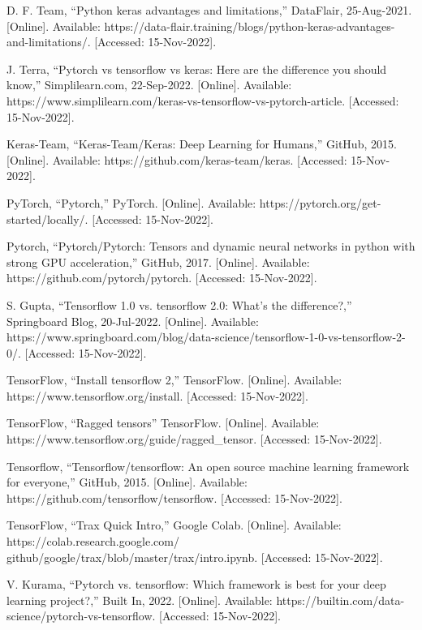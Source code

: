 \documentclass[conference]{IEEEtran}
\begin{document}
\begin{thebibliography}{00}

 D. F. Team, “Python keras advantages and limitations,” DataFlair, 25-Aug-2021. [Online]. Available: https://data-flair.training/blogs/python-keras-advantages-and-limitations/. [Accessed: 15-Nov-2022]. 

 J. Terra, “Pytorch vs tensorflow vs keras: Here are the difference you should know,” Simplilearn.com, 22-Sep-2022. [Online]. Available: https://www.simplilearn.com/keras-vs-tensorflow-vs-pytorch-article. [Accessed: 15-Nov-2022]. 

 Keras-Team, “Keras-Team/Keras: Deep Learning for Humans,” GitHub, 2015. [Online]. Available: https://github.com/keras-team/keras. [Accessed: 15-Nov-2022]. 

 PyTorch, “Pytorch,” PyTorch. [Online]. Available: https://pytorch.org/get-started/locally/. [Accessed: 15-Nov-2022]. 

 Pytorch, “Pytorch/Pytorch: Tensors and dynamic neural networks in python with strong GPU acceleration,” GitHub, 2017. [Online]. Available: https://github.com/pytorch/pytorch. [Accessed: 15-Nov-2022]. 

 S. Gupta, “Tensorflow 1.0 vs. tensorflow 2.0: What's the difference?,” Springboard Blog, 20-Jul-2022. [Online]. Available: https://www.springboard.com/blog/data-science/tensorflow-1-0-vs-tensorflow-2-0/. [Accessed: 15-Nov-2022]. 

 TensorFlow, “Install tensorflow 2,” TensorFlow. [Online]. Available: https://www.tensorflow.org/install. [Accessed: 15-Nov-2022]. 

 TensorFlow, “Ragged tensors” TensorFlow. [Online]. Available: https://www.tensorflow.org/guide/ragged\_tensor. [Accessed: 15-Nov-2022]. 

 Tensorflow, “Tensorflow/tensorflow: An open source machine learning framework for everyone,” GitHub, 2015. [Online]. Available: https://github.com/tensorflow/tensorflow. [Accessed: 15-Nov-2022]. 

 TensorFlow, “Trax Quick Intro,” Google Colab. [Online]. Available: https://colab.research.google.com/ github/google/trax/blob/master/trax/intro.ipynb. [Accessed: 15-Nov-2022]. 

 V. Kurama, “Pytorch vs. tensorflow: Which framework is best for your deep learning project?,” Built In, 2022. [Online]. Available: https://builtin.com/data-science/pytorch-vs-tensorflow. [Accessed: 15-Nov-2022]. 

\end{thebibliography}
\vspace{12pt}
\end{document}
